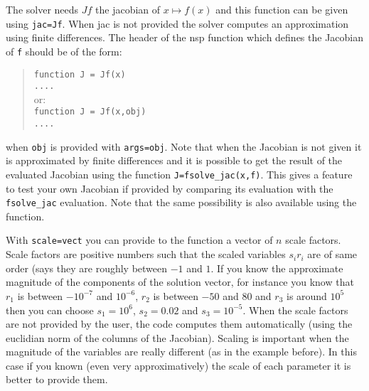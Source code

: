 \begin{mandescription}
The solver needs $Jf$ the jacobian of $x \mapsto f(x)$ and this function can be given using 
\verb+jac=Jf+. When jac is not provided the solver computes an approximation using finite differences. 
The header of the nsp function which defines the Jacobian of \verb+f+ should be of the form:
\begin{quote}
{\tt function J = Jf(x) \\
      ....}\\
or:\\
{\tt function J = Jf(x,obj) \\
     ....}
\end{quote}
when {\tt obj} is provided with {\tt args=obj}. 
Note that when the Jacobian is not given it is approximated by finite differences and it is 
possible to get the result of the evaluated Jacobian using the function \verb+J=fsolve_jac(x,f)+.
This gives a feature to test your own Jacobian if provided by comparing its evaluation with the 
\verb+fsolve_jac+ evaluation. Note that the same possibility is also available using the 
 function. 

With \verb+scale=vect+ you can provide to the function a vector of $n$ scale factors.
Scale factors are positive numbers such that the scaled variables $s_i r_i$ are of same order
(says they are roughly between $-1$ and $1$. If you know the approximate magnitude of the components
of the solution vector, for instance you know that $r_1$ is between $-10^{-7}$ and $10^{-6}$, 
$r_2$ is between $-50$ and $80$ and $r_3$ is around  $10^{5}$ then you can choose $s_1 = 10^6$, 
$s_2 = 0.02$ and $s_3 = 10^{-5}$. When the scale factors are not provided by the user, the code 
computes them automatically (using the euclidian norm of the columns of the Jacobian). Scaling is 
important when the magnitude of the variables are really different (as in the example before). In 
this case if you known (even very approximatively) the scale of each parameter it is better
to provide them.  

\end{mandescription} 

